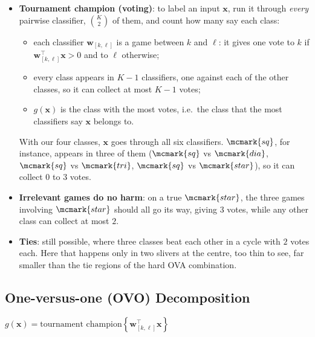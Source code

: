 \begin{itemize}
    \item \textbf{Tournament champion (voting)}: to label an input \(\bm{x}\),
        run it through \emph{every} pairwise classifier, \(\binom{K}{2}\) of
        them, and count how many say each class:
        \begin{itemize}
            \item each classifier \(\bm{w}_{[k, \ell]}\) is a game between \(k\)
                and \(\ell\): it gives one vote to \(k\) if \(\bm{w}_{[k,
                \ell]}^\top \bm{x} > 0\) and to \(\ell\) otherwise;
            \item every class appears in \(K - 1\) classifiers, one against
                each of the other classes, so it can collect at most \(K - 1\)
                votes;
            \item \(g(\bm{x})\) is the class with the most votes, i.e.\ the
                class that the most classifiers say \(\bm{x}\) belongs to.
        \end{itemize}
        With our four classes, \(\bm{x}\) goes through all six classifiers.
        \(\mcmark{sq}\), for instance, appears in three of them
        (\(\mcmark{sq}\) vs \(\mcmark{dia}\), \(\mcmark{sq}\) vs
        \(\mcmark{tri}\), \(\mcmark{sq}\) vs \(\mcmark{star}\)), so it can
        collect \(0\) to \(3\) votes.
    \item \textbf{Irrelevant games do no harm}: on a true \(\mcmark{star}\), the
        three games involving \(\mcmark{star}\) should all go its way, giving
        \(3\) votes, while any other class can collect at most \(2\).
    \item \textbf{Ties}: still possible, where three classes beat each other in
        a cycle with \(2\) votes each. Here that happens only in two slivers at
        the centre, too thin to see, far smaller than the tie regions of the
        hard OVA combination.
\end{itemize}

\subsection{One-versus-one (OVO) Decomposition}

\begin{algorithm}[H]
    \caption{One-versus-one (OVO) Decomposition}\label{alg:ovo}
    \Return \(g(\bm{x}) = \text{tournament champion} \left\{
    \bm{w}_{[k, \ell]}^\top \bm{x} \right\}\)\;
\end{algorithm}

